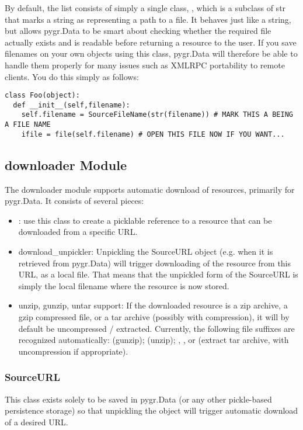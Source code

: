 \documentclass{howto}
\begin{document}
By default, the  list consists of simply a single
class, , which is a subclass of str
that marks a string as representing a path to a file.  It behaves
just like a string, but allows pygr.Data to be smart about checking
whether the required file actually exists and is readable before returning
a resource to the user.  If you save filenames on your own objects using
this class, pygr.Data will therefore be able to handle them properly for
many issues such as XMLRPC portability to remote clients.  You do this simply
as follows:
\begin{verbatim}
class Foo(object):
  def __init__(self,filename):
    self.filename = SourceFileName(str(filename)) # MARK THIS A BEING A FILE NAME
    ifile = file(self.filename) # OPEN THIS FILE NOW IF YOU WANT...
\end{verbatim}

\subsection{downloader Module}
The downloader module supports automatic download of resources,
primarily for pygr.Data.  It consists of several pieces:
\begin{itemize}
\item {}: use this class to create a picklable reference
to a resource that can be downloaded from a specific URL.  

\item download_unpickler: Unpickling the
SourceURL object (e.g. when it is retrieved from pygr.Data) will trigger
downloading of the resource from this URL, as a local file.  That means
that the unpickled form of the SourceURL is simply the local filename
where the resource is now stored.

\item unzip, gunzip, untar support: If the downloaded resource
is a zip archive, a gzip compressed file, or a tar archive (possibly
with compression), it will by default be uncompressed / extracted.
Currently, the following file suffixes are recognized automatically:
 (gunzip);  (unzip); , 
,  or  (extract tar
archive, with uncompression if appropriate).
\end{itemize}

\subsubsection{SourceURL}
This class exists solely to be saved in pygr.Data (or any other
pickle-based persistence storage) so that unpickling the object
will trigger automatic download of a desired URL.
\end{document}

